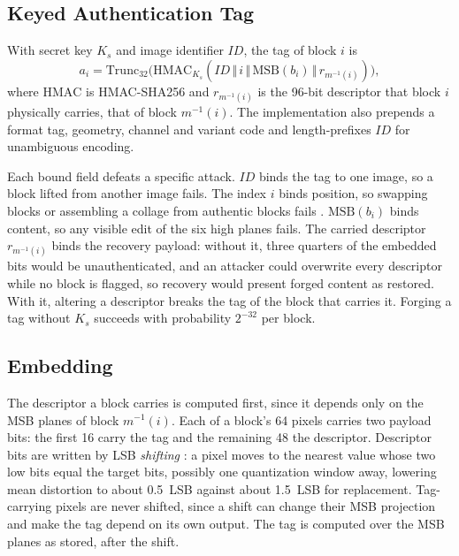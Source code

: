 \documentclass[conference]{IEEEtran}
\begin{document}
\subsection{Keyed Authentication Tag}
\label{ssec:tag}
With secret key $K_s$ and image identifier $ID$, the tag of block $i$ is
\begin{equation}
a_i=\mathrm{Trunc}_{32}\!\big(\mathrm{HMAC}_{K_s}(ID\,\Vert\,i\,\Vert\,\mathrm{MSB}(b_i)\,\Vert\,r_{m^{-1}(i)})\big),
\label{eq:tag}
\end{equation}
where $\mathrm{HMAC}$ is HMAC-SHA256 \cite{fips180-4} and $r_{m^{-1}(i)}$ is the 96-bit descriptor that block $i$ physically carries, that of block $m^{-1}(i)$. The implementation also prepends a format tag, geometry, channel and variant code and length-prefixes $ID$ for unambiguous encoding.

Each bound field defeats a specific attack. $ID$ binds the tag to one image, so a block lifted from another image fails. The index $i$ binds position, so swapping blocks or assembling a collage from authentic blocks fails \cite{holliman2000counterfeiting,fridrich2002security}. $\mathrm{MSB}(b_i)$ binds content, so any visible edit of the six high planes fails. The carried descriptor $r_{m^{-1}(i)}$ binds the recovery payload: without it, three quarters of the embedded bits would be unauthenticated, and an attacker could overwrite every descriptor while no block is flagged, so recovery would present forged content as restored. With it, altering a descriptor breaks the tag of the block that carries it. Forging a tag without $K_s$ succeeds with probability $2^{-32}$ per block.

\subsection{Embedding}
\label{ssec:embed}
The descriptor a block carries is computed first, since it depends only on the MSB planes of block $m^{-1}(i)$. Each of a block's 64 pixels carries two payload bits: the first 16 carry the tag and the remaining 48 the descriptor. Descriptor bits are written by LSB \emph{shifting} \cite{ausr1}: a pixel moves to the nearest value whose two low bits equal the target bits, possibly one quantization window away, lowering mean distortion to about 0.5~LSB against about 1.5~LSB for replacement. Tag-carrying pixels are never shifted, since a shift can change their MSB projection and make the tag depend on its own output. The tag is computed over the MSB planes as stored, after the shift.
\end{document}

